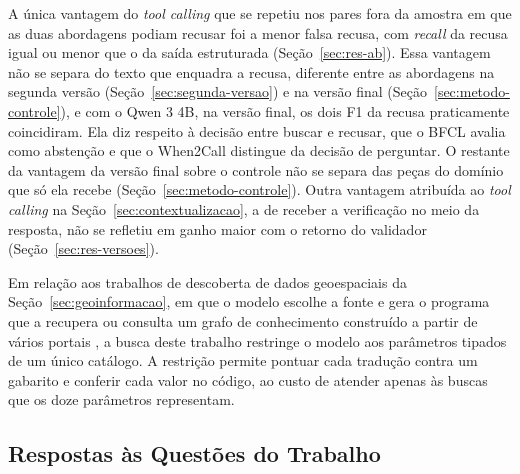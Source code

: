 A única vantagem do \textit{tool calling} que se repetiu nos pares fora da amostra em que as duas abordagens podiam recusar foi a menor falsa recusa, com \textit{recall} da recusa igual ou menor que o da saída estruturada (Seção~\ref{sec:res-ab}). Essa vantagem não se separa do texto que enquadra a recusa, diferente entre as abordagens na segunda versão (Seção~\ref{sec:segunda-versao}) e na versão final (Seção~\ref{sec:metodo-controle}), e com o Qwen 3 4B, na versão final, os dois F1 da recusa praticamente coincidiram. Ela diz respeito à decisão entre buscar e recusar, que o BFCL \cite{patil2025berkeley} avalia como abstenção e que o When2Call \cite{ross2025when2call} distingue da decisão de perguntar. O restante da vantagem da versão final sobre o controle não se separa das peças do domínio que só ela recebe (Seção~\ref{sec:metodo-controle}). Outra vantagem atribuída ao \textit{tool calling} na Seção~\ref{sec:contextualizacao}, a de receber a verificação no meio da resposta, não se refletiu em ganho maior com o retorno do validador (Seção~\ref{sec:res-versoes}).

Em relação aos trabalhos de descoberta de dados geoespaciais da Seção~\ref{sec:geoinformacao}, em que o modelo escolhe a fonte e gera o programa que a recupera \cite{ning2025autonomous} ou consulta um grafo de conhecimento construído a partir de vários portais \cite{li2025question}, a busca deste trabalho restringe o modelo aos parâmetros tipados de um único catálogo. A restrição permite pontuar cada tradução contra um gabarito e conferir cada valor no código, ao custo de atender apenas às buscas que os doze parâmetros representam.

\subsection{Respostas às Questões do Trabalho}
\label{sec:respostas}

